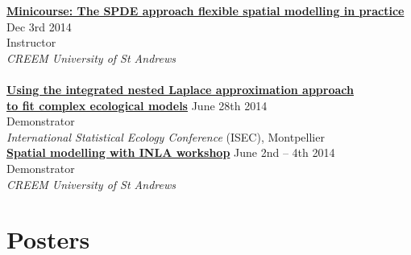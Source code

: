 \documentclass[10pt,letter]{article}
\begin{document}
 {\textbf{\href{http://creem2.st-andrews.ac.uk/past-seminars/}{Minicourse: The SPDE approach flexible spatial modelling in practice}}} \hfill Dec 3rd  2014\\
 Instructor\\
 {\sl CREEM University of St Andrews}\\ 
 \hdashrule[0.5ex]{4cm}{1pt}{1pt}\\
{\href{http://www.r-inla.org/events/inlacourseatisec2014}{\textbf {Using the integrated nested Laplace approximation approach}}} \\ {\href{http://www.r-inla.org/events/inlacourseatisec2014}{\textbf{to fit complex ecological models}}}  \hfill June 28th 2014\\
 Demonstrator\\
 {\sl International Statistical Ecology Conference} (ISEC), Montpellier\\ 
\newpage
{\textbf{\href{http://creem2.st-andrews.ac.uk/workshops/past-workshops/}{Spatial modelling with INLA workshop}}} \hfill June 2nd – 4th  2014\\
 Demonstrator\\
 {\sl CREEM University of St Andrews}\\ 
 
 



 \vspace{-1mm}

\section*{Posters}
\vspace{1mm}
\end{document}
